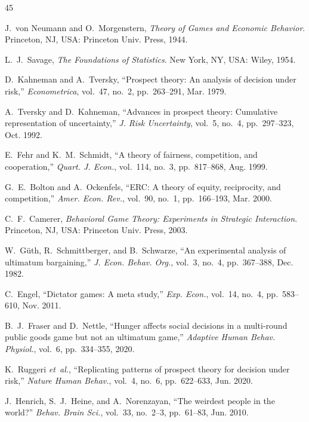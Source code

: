 \documentclass[journal]{IEEEtran}
\begin{document}
\begin{thebibliography}{45}

J.~von Neumann and O.~Morgenstern, \emph{Theory of Games and Economic Behavior}.
Princeton, NJ, USA: Princeton Univ. Press, 1944.

L.~J.~Savage, \emph{The Foundations of Statistics}.
New York, NY, USA: Wiley, 1954.

D.~Kahneman and A.~Tversky, ``Prospect theory: An analysis of decision under risk,''
\emph{Econometrica}, vol.~47, no.~2, pp.~263--291, Mar. 1979.

A.~Tversky and D.~Kahneman, ``Advances in prospect theory: Cumulative representation of uncertainty,''
\emph{J. Risk Uncertainty}, vol.~5, no.~4, pp.~297--323, Oct. 1992.

E.~Fehr and K.~M.~Schmidt, ``A theory of fairness, competition, and cooperation,''
\emph{Quart. J. Econ.}, vol.~114, no.~3, pp.~817--868, Aug. 1999.

G.~E.~Bolton and A.~Ockenfels, ``ERC: A theory of equity, reciprocity, and competition,''
\emph{Amer. Econ. Rev.}, vol.~90, no.~1, pp.~166--193, Mar. 2000.

C.~F.~Camerer, \emph{Behavioral Game Theory: Experiments in Strategic Interaction}.
Princeton, NJ, USA: Princeton Univ. Press, 2003.

W.~G\"{u}th, R.~Schmittberger, and B.~Schwarze, ``An experimental analysis of ultimatum bargaining,''
\emph{J. Econ. Behav. Org.}, vol.~3, no.~4, pp.~367--388, Dec. 1982.

C.~Engel, ``Dictator games: A meta study,''
\emph{Exp. Econ.}, vol.~14, no.~4, pp.~583--610, Nov. 2011.

B.~J.~Fraser and D.~Nettle, ``Hunger affects social decisions in a multi-round public goods game but not an ultimatum game,''
\emph{Adaptive Human Behav. Physiol.}, vol.~6, pp.~334--355, 2020.

K.~Ruggeri \emph{et~al.}, ``Replicating patterns of prospect theory for decision under risk,''
\emph{Nature Human Behav.}, vol.~4, no.~6, pp.~622--633, Jun. 2020.

J.~Henrich, S.~J.~Heine, and A.~Norenzayan, ``The weirdest people in the world?''
\emph{Behav. Brain Sci.}, vol.~33, no.~2--3, pp.~61--83, Jun. 2010.


\end{thebibliography}
\end{document}
